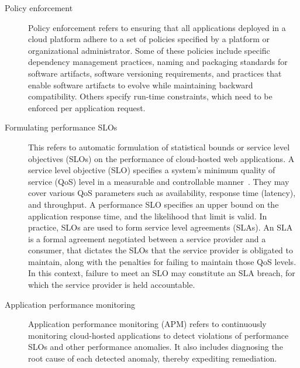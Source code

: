 \begin{description}
\item [Policy enforcement]
Policy enforcement refers to ensuring that all applications deployed in a cloud platform
adhere to a set of policies specified by a platform or organizational administrator.
Some of these policies include specific
dependency management practices, naming and packaging standards for software artifacts, 
software versioning requirements, and practices that enable software artifacts to evolve 
while maintaining backward compatibility.
Others specify run-time constraints, which need to be enforced per application request.

\item [Formulating performance SLOs]
This refers to automatic formulation of statistical bounds or service level objectives (SLOs) on the 
performance of cloud-hosted web applications.
A service level objective (SLO) specifies a system's minimum quality of service (QoS) level in a measurable and
controllable manner~\cite{smj2000}. They may cover various QoS
parameters such as availability, response time (latency), and throughput. A performance SLO
specifies an upper bound on the application response time, and the likelihood that limit is valid.
In practice, SLOs are used to form service level agreements (SLAs). An SLA is
a formal agreement negotiated between a service provider and a consumer, that dictates the SLOs 
that the service provider is obligated to maintain, along with the 
penalties for failing to maintain those QoS levels. In this context, failure to meet an SLO may
constitute an SLA breach, for which the service provider is held accountable.

\item [Application performance monitoring]
Application performance monitoring (APM) refers to continuously monitoring cloud-hosted applications
to detect violations of performance SLOs and other performance anomalies. 
It also includes diagnosing the root cause of each detected anomaly, thereby expediting
remediation.
\end{description}

